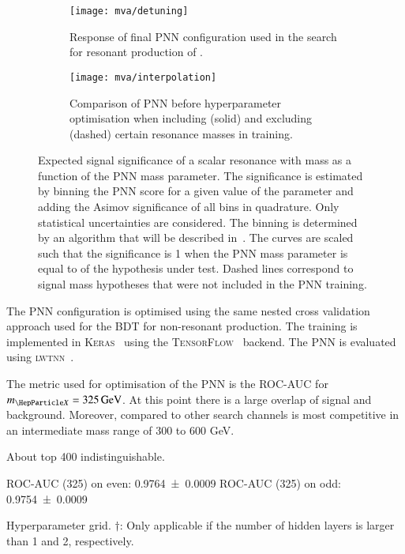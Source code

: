 \begin{figure}[htbp]
  \centering

  \begin{subfigure}[t]{.49\textwidth}
    \texttt{[image: mva/detuning]}
    \caption{Response of final PNN configuration used in the search
      for resonant production of \HH.}
  \end{subfigure}\hfill%
  \begin{subfigure}[t]{.49\textwidth}
    \centering
    \texttt{[image: mva/interpolation]}
    \caption{Comparison of PNN before hyperparameter optimisation when
      including (solid) and excluding (dashed) certain resonance
      masses in training.}
  \end{subfigure}

  \caption{Expected signal significance of a scalar resonance with
    mass \mX as a function of the PNN mass parameter. The significance
    is estimated by binning the PNN score for a given value of the
    parameter and adding the Asimov significance of all bins in
    quadrature. Only statistical uncertainties are considered. The
    binning is determined by an algorithm that will be described
    in~. The curves are scaled such that the
    significance is 1 when the PNN mass parameter is equal to \mX of
    the hypothesis under test. Dashed lines correspond to signal mass
    hypotheses that were not included in the PNN training.}
  \label{fig:pnn_properties}
\end{figure}

The PNN configuration is optimised using the same nested cross
validation approach used for the BDT for non-resonant \HH
production. The training is implemented in \textsc{Keras}~\cite{keras}
using the \textsc{TensorFlow}~\cite{tensorflow2015-whitepaper}
backend. The PNN is evaluated using \textsc{lwtnn}~\cite{lwtnn}.

The metric used for optimisation of the PNN is the ROC-AUC for
$\mX = \SI{325}{\GeV}$. At this point there is a large overlap of
signal and background. Moreover, compared to other search channels
\bbtautau is most competitive in an intermediate mass range of 300 to
600 GeV.

About top 400 indistinguishable.

ROC-AUC (325) on even: \num{0.9764 +- 0.0009} ROC-AUC (325) on odd:
\num{0.9754 +- 0.0009}

\begin{table}[htbp]
  \centering
  
  \caption{Hyperparameter grid. $\dagger$: Only applicable if the
    number of hidden layers is larger than 1 and 2, respectively.}
  \label{tab:hyperparameter_grid_pnn}
\end{table}

